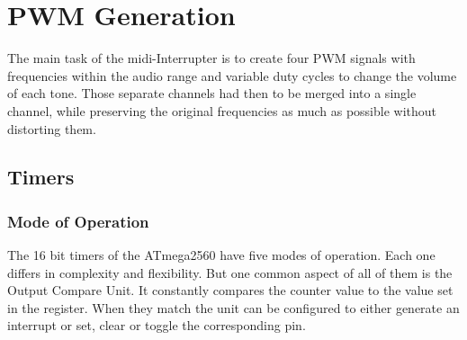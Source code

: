 \setchapterpreamble[u]{\margintoc}

\chapter{PWM Generation}

The main task of the \gls{midi}-Interrupter is to create four PWM signals with frequencies within the audio range and variable duty cycles to change the volume of each tone. Those separate channels had then to be merged into a single channel, while preserving the original frequencies as much as possible without distorting them.

\section{Timers}

\subsection{Mode of Operation}

The 16 bit timers of the ATmega2560 have five modes of operation. Each one differs in complexity and flexibility. But one common aspect of all of them is the Output Compare Unit. It constantly compares the counter value to the value set in the  register. When they match the unit can be configured to either generate an interrupt or set, clear or toggle the corresponding  pin.

